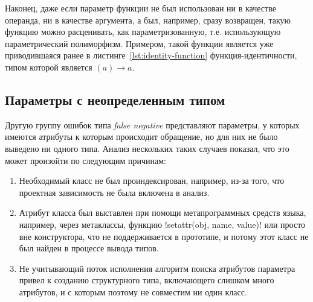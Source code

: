 Наконец, даже если параметр функции не был использован ни в качестве операнда,
ни в качестве аргумента, а был, например, сразу возвращен, такую функцию можно
расценивать, как параметризованную, т.е. использующую параметрический
полиморфизм. Примером, такой функции является уже приводившаяся ранее в
листинге~\ref{lst:identity-function} функция-идентичности, типом которой
является $(a) \rightarrow a$.

\subsection{Параметры с неопределенным типом}
\label{sub:undefined-type-parameters}

Другую группу ошибок типа \emph{false negative} представляют параметры, у которых
имеются атрибуты к которым происходит обращение, но для них не было выведено ни
одного типа. Анализ нескольких таких случаев показал, что это может произойти по
следующим причинам:

\begin{enumerate}
    \item Необходимый класс не был проиндексирован, например, из-за того, что
      проектная зависимость не была включена в анализ.

    \item Атрибут класса был выставлен при помощи метапрограммных средств языка,
      например, через метаклассы, функцию !setattr(obj, name, value)! или просто
      вне конструктора, что не поддерживается в прототипе, и потому этот класс не был
      найден в процессе вывода типов.

    \item Не учитывающий поток исполнения алгоритм поиска атрибутов параметра
      привел к созданию структурного типа, включающего слишком много
      атрибутов, и с которым поэтому не совместим ни один класс.

\end{enumerate}

